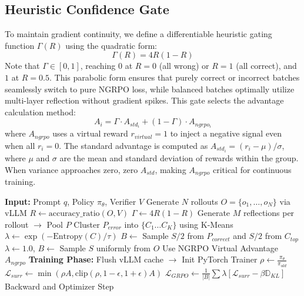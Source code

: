 \subsection{Heuristic Confidence Gate}\label{subsec:heuristic_gate}
To maintain gradient continuity, we define a differentiable heuristic gating function $\Gamma(R)$ using the quadratic form:
\begin{equation}
\Gamma(R) = 4R(1-R)
\end{equation}
Note that $\Gamma \in [0, 1]$, reaching $0$ at $R=0$ (all wrong) or $R=1$ (all correct), and $1$ at $R=0.5$. This parabolic form ensures that purely correct or incorrect batches seamlessly switch to pure NGRPO loss, while balanced batches optimally utilize multi-layer reflection without gradient spikes. This gate selects the advantage calculation method:
\begin{equation}
A_{i} = \Gamma \cdot A_{std_i} + (1-\Gamma) \cdot A_{ngrpo_i}
\end{equation}
where $A_{ngrpo}$ uses a virtual reward $r_{virtual} = 1$ to inject a negative signal even when all $r_i=0$. The standard advantage is computed as $A_{std_i} = (r_i - \mu) / \sigma$, where $\mu$ and $\sigma$ are the mean and standard deviation of rewards within the group. When variance approaches zero, zero $A_{std}$, making $A_{ngrpo}$ critical for continuous training.

\begin{algorithm}
\caption{SB-GRPO Training Step}
\label{alg:training_step}
\begin{algorithmic}[1]
\STATE \textbf{Input:} Prompt $q$, Policy $\pi_\theta$, Verifier $V$
\STATE Generate $N$ rollouts $O = \{o_1, \dots, o_N\}$ via vLLM
\STATE $R \gets \text{accuracy\_ratio}(O, V)$
\STATE $\Gamma \gets 4R(1-R)$
    \STATE Generate $M$ reflections per rollout $\to$ Pool $P$
    \STATE Cluster $P_{error}$ into $\{C_1 \dots C_K\}$ using K-Means
    \STATE $\lambda \gets \exp(-\text{Entropy}(C)/\tau)$
    \STATE $B \gets$ Sample $S/2$ from $P_{correct}$ and $S/2$ from $C_{top}$
\ELSE
    \STATE $\lambda \gets 1.0$, $B \gets$ Sample $S$ uniformly from $O$
    \STATE Use NGRPO Virtual Advantage $A_{ngrpo}$
\ENDIF
\STATE \textbf{Training Phase:}
\STATE Flush vLLM cache $\to$ Init PyTorch Trainer
\STATE $\rho \gets \frac{\pi_\theta}{\pi_{old}}$
\STATE $\mathcal{L}_{surr} \gets \min\left(\rho A, \text{clip}\left(\rho, 1-\epsilon, 1+\epsilon\right)A\right)$
\STATE $\mathcal{L}_{GRPO} \gets \frac{1}{|B|} \sum \lambda \left[ \mathcal{L}_{surr} - \beta \mathbb{D}_{KL} \right]$
\STATE Backward and Optimizer Step
\end{algorithmic}
\end{algorithm}

